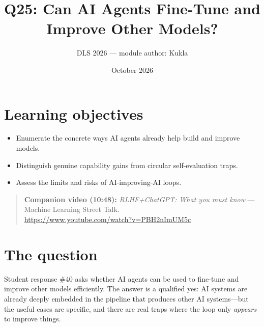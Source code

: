 \documentclass[11pt]{article}
\title{Q25: Can AI Agents Fine-Tune and Improve Other Models?}
\author{DLS 2026 --- module author: Kukla}
\date{October 2026}
\begin{document}
\maketitle

\section*{Learning objectives}
\begin{itemize}[leftmargin=1.4em]
\item Enumerate the concrete ways AI agents already help build and improve models.
\item Distinguish genuine capability gains from circular self-evaluation traps.
\item Assess the limits and risks of AI-improving-AI loops.
\end{itemize}

\begin{quote}\small\textbf{Companion video (10:48):} \emph{RLHF+ChatGPT: What you must know} --- Machine Learning Street Talk.\\ \url{https://www.youtube.com/watch?v=PBH2nImUM5c}\end{quote}

\section{The question}
Student response \#40 asks whether AI agents can be used to fine-tune and improve other models
efficiently. The answer is a qualified yes: AI systems are already deeply embedded in the pipeline that
produces other AI systems---but the useful cases are specific, and there are real traps where the loop
only \emph{appears} to improve things.
\end{document}
